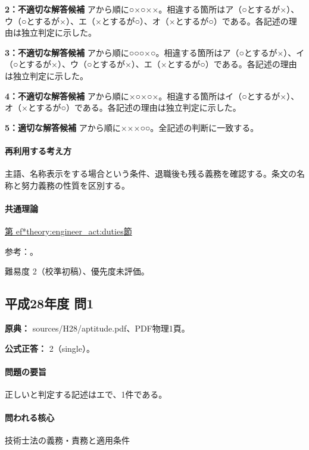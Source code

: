 \noindent\textbf{2：不適切な解答候補} アから順に○×○××。相違する箇所はア（○とするが×）、ウ（○とするが×）、エ（×とするが○）、オ（×とするが○）である。各記述の理由は独立判定に示した。\par

\noindent\textbf{3：不適切な解答候補} アから順に○○○×○。相違する箇所はア（○とするが×）、イ（○とするが×）、ウ（○とするが×）、エ（×とするが○）である。各記述の理由は独立判定に示した。\par

\noindent\textbf{4：不適切な解答候補} アから順に×○×○×。相違する箇所はイ（○とするが×）、オ（×とするが○）である。各記述の理由は独立判定に示した。\par

\noindent\textbf{5：適切な解答候補} アから順に×××○○。全記述の判断に一致する。\par

\paragraph{再利用する考え方} 主語、名称表示をする場合という条件、退職後も残る義務を確認する。条文の名称と努力義務の性質を区別する。

\paragraph{共通理論} \hyperref[theory:engineer_act:duties]{第
ef*{theory:engineer_act:duties}節}

\par 参考：\cite{engineer_act_current}。

\par 難易度 2（校準初稿）、優先度未評価。

\subsection{平成28年度 問1}
\label{q:h28-reg-apt-01}

\noindent\textbf{原典：} sources/H28/aptitude.pdf、PDF物理1頁。

\textbf{公式正答：} 2（single）。

\paragraph{問題の要旨} 正しいと判定する記述はエで、1件である。

\paragraph{問われる核心} 技術士法の義務・責務と適用条件

